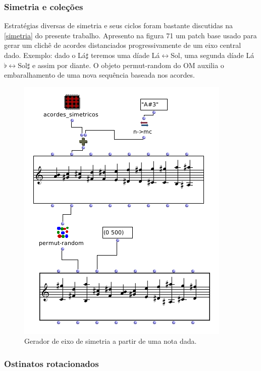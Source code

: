 \documentclass[
	12pt,				%
	openright,			%
	twoside,			%
	a4paper,			%
	english,			%
	french,				%
	spanish,			%
	brazil				%
	]{abntex2}
\begin{document}
\subsubsection{Simetria e coleções }

Estratégias diversas de simetria e seus ciclos foram bastante discutidas na \autoref{simetria} do presente trabalho. Apresento na figura 71 um patch base usado para gerar um clichê de acordes distanciados progressivamente de um eixo central dado. Exemplo: dado o Lá$\sharp$ teremos uma díade Lá$\leftrightarrow$Sol, uma segunda díade Lá$\flat \leftrightarrow$Sol$\sharp$ e assim por diante. O objeto permut-random do OM auxilia o embaralhamento de uma nova sequência baseada nos acordes.

\begin{figure}[!h]
	\caption{\label{fig_grafico}Gerador de eixo de simetria a partir de uma nota dada. }
	\begin{center}
	    \includegraphics[scale=0.4]{OMPD/simetricos01.png}
	\end{center}
\end{figure}


\subsubsection{Ostinatos rotacionados}
\end{document}

